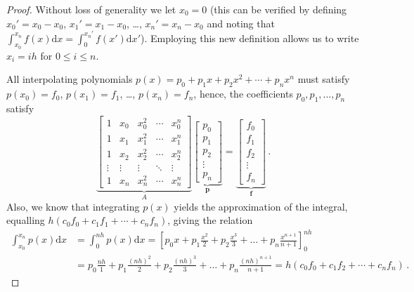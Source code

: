 \begin{proof}
Without loss of generality we let $x_0 = 0$ (this can be verified by defining $x_0'=x_0-x_0$, $x_1'=x_1-x_0$, \dots, $x_n'=x_n-x_0$ and noting that $\int_{x_0}^{x_n} f(x) \mathrm d x = \int_{0}^{x_n'} f(x') \mathrm dx'$).
Employing this new definition allows us to write $x_i = ih$ for $0 \leq i \leq n$.

All interpolating polynomials $p(x)=p_0 + p_1 x + p_2 x^2 + \cdots + p_n x^n$ must satisfy $p(x_0)=f_0$, $p(x_1)=f_1$, \dots, $p(x_n)=f_n$, hence, the coefficients $p_0, p_1, \dots, p_n$ satisfy
\begin{equation}
    \underbrace{\begin{bmatrix}
        1&x_0&x_0^2&\cdots&x_0^n \\
        1&x_1&x_1^2&\cdots&x_1^n \\
        1&x_2&x_2^2&\cdots&x_2^n \\
        \vdots&\vdots & \vdots & \ddots & \vdots\\
        1&x_n&x_n^2&\cdots&x_n^n
    \end{bmatrix}}_{A}
    \underbrace{\begin{bmatrix}
        p_0\\
        p_1\\
        p_2\\
        \vdots \\
        p_n
    \end{bmatrix}}_{\mathbf p}
    =
    \underbrace{\begin{bmatrix}
        f_0 \\
        f_1 \\
        f_2 \\
        \vdots \\
        f_n
    \end{bmatrix}}_{\mathbf f} \,.\label{eq:mat1}
\end{equation}
Also, we know that integrating $p(x)$ yields the approximation of the integral, equalling $h(c_0 f_0 + c_1f_1 + \cdots + c_nf_n)$, giving the relation
\begin{align}
    \int_{x_0}^{x_n} p(x) \mathrm d x &=
    \int_{0}^{nh} p(x) \mathrm d x =
    \left[ p_0 x + p_1 \frac{x^2}{2} + p_2 \frac{x^3}{3} + \dots + p_n \frac{x^{n+1}}{n+1} \right]_{0}^{nh} \nonumber \\
                                      &= p_0 \frac{nh}{1} + p_1 \frac{(nh)^2}{2} + p_2 \frac{(nh)^3}{3} + \dots + p_n \frac{(nh)^{n+1}}{n+1} = h(c_0 f_0 + c_1 f_2 + \cdots + c_n f_n) \,. \nonumber

\end{align}
\end{proof}
